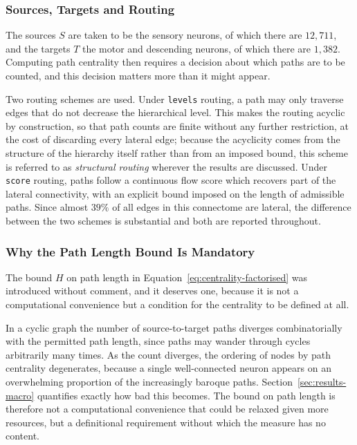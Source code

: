 \documentclass[12pt,a4paper,oneside]{article}
\theoremstyle{definition}
\theoremstyle{plain}
\newcommand{\code}[1]{\texttt{#1}}
\begin{document}
\subsubsection{Sources, Targets and Routing}

The sources $S$ are taken to be the sensory neurons, of which there are
$12{,}711$, and the targets $T$ the motor and descending neurons, of which
there are $1{,}382$. Computing path centrality then requires a decision
about which paths are to be counted, and this decision matters more than it
might appear.

Two routing schemes are used. Under \code{levels} routing, a path may only
traverse edges that do not decrease the hierarchical level. This makes the
routing acyclic by construction, so that path counts are finite without any
further restriction, at the cost of discarding every lateral edge; because
the acyclicity comes from the structure of the hierarchy itself rather than
from an imposed bound, this scheme is referred to as \emph{structural
routing} wherever the results are discussed. Under \code{score} routing, paths follow a
continuous flow score which recovers part of the lateral connectivity, with
an explicit bound imposed on the length of admissible paths. Since almost
$39\%$ of all edges in this connectome are lateral, the difference between
the two
schemes is substantial and both are reported throughout.

\subsubsection{Why the Path Length Bound Is Mandatory}

The bound $H$ on path length in Equation~\eqref{eq:centrality-factorised}
was introduced without comment, and it deserves one, because it is not a
computational convenience but a condition for the centrality to be defined
at all.

In a cyclic graph the number of source-to-target paths diverges
combinatorially with the permitted path length, since paths may wander
through cycles arbitrarily many times. As the count diverges, the ordering
of nodes by path centrality degenerates, because a single well-connected
neuron appears on an overwhelming proportion of the increasingly baroque
paths. Section~\ref{sec:results-macro} quantifies exactly how bad this
becomes. The bound on path length is therefore not a computational
convenience that could be relaxed given more resources, but a definitional
requirement without which the measure has no content.
\end{document}
